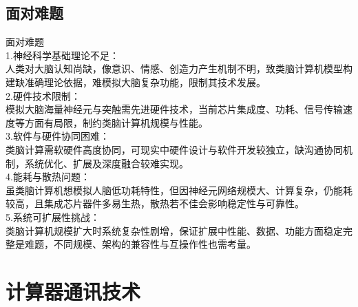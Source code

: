 \documentclass[supercite]{Experimental_Report}
\theoremstyle{definition}
\begin{document}
	\subsection{面对难题}
	面对难题\\
	1.神经科学基础理论不足：\\人类对大脑认知尚缺，像意识、情感、创造力产生机制不明，致类脑计算机模型构建缺准确理论依据，难模拟大脑复杂功能，限制其技术发展。\\
	2.硬件技术限制：\\模拟大脑海量神经元与突触需先进硬件技术，当前芯片集成度、功耗、信号传输速度等方面有局限，制约类脑计算机规模与性能。\\
	3.软件与硬件协同困难：\\类脑计算需软硬件高度协同，可现实中硬件设计与软件开发较独立，缺沟通协同机制，系统优化、扩展及深度融合较难实现。\\
	4.能耗与散热问题：\\虽类脑计算机想模拟人脑低功耗特性，但因神经元网络规模大、计算复杂，仍能耗较高，且集成芯片器件多易生热，散热若不佳会影响稳定性与可靠性。\\
	5.系统可扩展性挑战：\\类脑计算机规模扩大时系统复杂性剧增，保证扩展中性能、数据、功能方面稳定完整是难题，不同规模、架构的兼容性与互操作性也需考量。
	
		
	\section{计算器通讯技术}
\end{document}
